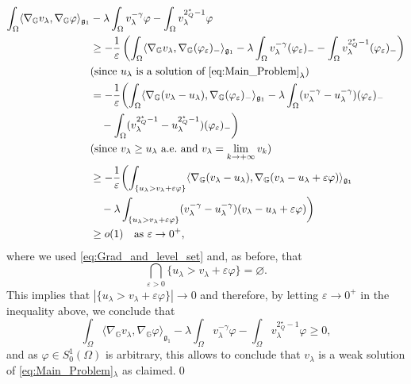 \documentclass[11pt]{amsart}
\numberwithin{equation}{section} %
\theoremstyle{definition}
\def\G{\mathbb{G}}
\newcommand{\m}{\mbox}
\newcommand{\fine}{\qed\newline}
\begin{document}
\[
\begin{split}
	\int_\Omega\langle \nabla_\G v_\lambda,\nabla_\G \varphi\rangle_{\mathfrak{g}_{1}} 
	&- \lambda \int_\Omega v_\lambda^{-\gamma}\varphi-\int_\Omega v_\lambda^{2^\star_Q-1}\varphi\\
	&\geq-\frac{1}{\varepsilon} \left(\int_\Omega \langle \nabla_\G v_\lambda,\nabla_\G (\varphi_\varepsilon)_-\rangle_{\mathfrak{g}_{1}}
	-\lambda\int_\Omega v_\lambda^{-\gamma}(\varphi_\varepsilon)_--\int_\Omega v_\lambda^{2^\star_Q-1}(\varphi_\varepsilon)_-\right)\\
	&(\m{since }u_\lambda\m{ is a solution of \eqref{eq:Main_Problem}}_\lambda)\\
	&=-\frac{1}{\varepsilon} \biggl(\int_\Omega \langle \nabla_\G(v_\lambda-u_\lambda),\nabla_\G(\varphi_\varepsilon)_-\rangle_{\mathfrak{g}_{1}}
	-\lambda\int_\Omega(v_\lambda^{-\gamma}-u_\lambda^{-\gamma})(\varphi_\varepsilon)_-\\
	&\ \ \ 	-\int_\Omega(v_\lambda^{2^\star_Q-1}-u_\lambda^{2^\star_Q-1})(\varphi_\varepsilon)_-\biggl)\\
	\vspace{6pt}
	&(\m{since }v_\lambda\geq u_\lambda\m{ a.e.~and }v_\lambda=\lim_{k\to+\infty}v_k)\\
	&\geq -\frac{1}{\varepsilon} 
	\biggl(\int_{\{u_\lambda> v_\lambda+\varepsilon\varphi\}}\langle \nabla_\G(v_\lambda-u_\lambda),\nabla_\G (v_\lambda-u_\lambda+\varepsilon\varphi)\rangle_{\mathfrak{g}_{1}}\\
	&\ \ \ 	-\lambda\int_{\{u_\lambda> v_\lambda+\varepsilon\varphi\}}(v_\lambda^{-\gamma}-u_\lambda^{-\gamma})(v_\lambda-u_\lambda+\varepsilon\varphi)\biggl)\\
	&\geq o(1)\ \ \ \m{as}\ \varepsilon\to0^+,
\end{split}
\]
\noindent where we used \eqref{eq:Grad_and_level_set}
and, as before, that
\[
\bigcap_{\varepsilon>0}\{u_\lambda> v_\lambda+\varepsilon\varphi\}=\varnothing.
\]
This implies that $|\{u_\lambda>v_\lambda+\varepsilon\varphi\}|\to 0$
and therefore, by letting $\varepsilon\to0^+$ in the inequality above, we conclude that
\begin{equation}
	\int_\Omega\langle \nabla_\G v_\lambda,\nabla_\G\varphi\rangle_{\mathfrak{g}_{1}}-\lambda\int_\Omega v_\lambda^{-\gamma}\varphi
	-\int_\Omega v_\lambda^{2^\star_Q-1}\varphi\geq0,
\end{equation}
and as $\varphi \in S^1_0(\Omega)$ is arbitrary, this allows to conclude that $v_\lambda$
is a weak solution of \eqref{eq:Main_Problem}$_\lambda$ as claimed.\fine
\end{document}
